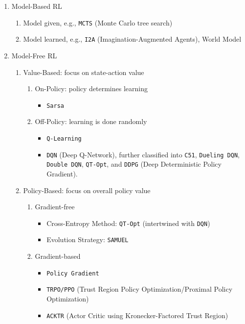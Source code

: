 \begin{enumerate}
	\item Model-Based RL
	\begin{enumerate}
		\item Model given, e.g., \texttt{MCTS} (Monte Carlo tree search)
		\item Model learned, e.g., \texttt{I2A} (Imagination-Augmented Agents), World Model
	\end{enumerate}
	
	\item Model-Free RL
	\begin{enumerate}
		\item Value-Based: focus on state-action value
		\begin{enumerate}
			\item On-Policy: policy determines learning
			\begin{itemize}
				\item \texttt{Sarsa}
			\end{itemize}
			\item Off-Policy: learning is done randomly
			\begin{itemize}
				\item \texttt{Q-Learning}
				\item \texttt{DQN} (Deep Q-Network), 
				further classified into \texttt{C51},
				\texttt{Dueling DQN}, \texttt{Double DQN}, \texttt{QT-Opt},
				and \texttt{DDPG} (Deep Deterministic Policy Gradient).
			\end{itemize}
		\end{enumerate}
		\item Policy-Based: focus on overall policy value
		\begin{enumerate}
			\item Gradient-free
			\begin{itemize}
				\item Cross-Entropy Method: \texttt{QT-Opt} (intertwined with \texttt{DQN})
				\item Evolution Strategy: \texttt{SAMUEL}
			\end{itemize}
			\item Gradient-based
			\begin{itemize}
				\item \texttt{Policy Gradient}
				\item \texttt{TRPO/PPO} (Trust Region Policy Optimization/Proximal Policy Optimization)
				\item \texttt{ACKTR} (Actor Critic using Kronecker-Factored Trust Region)

\end{itemize}
\end{enumerate}
\end{enumerate}
\end{enumerate}
